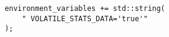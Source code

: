 \begin{verbatim}
    environment_variables += std::string(
        " VOLATILE_STATS_DATA='true'"
    );
\end{verbatim}